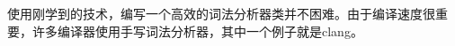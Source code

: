 使用刚学到的技术，编写一个高效的词法分析器类并不困难。由于编译速度很重要，许多编译器使用手写词法分析器，其中一个例子就是clang。

































